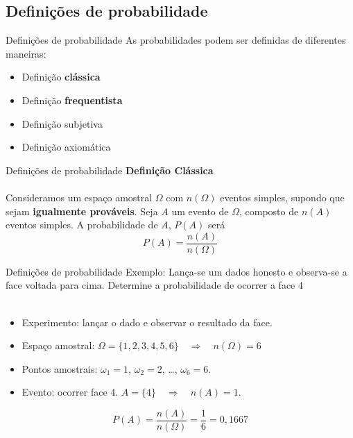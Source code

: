 \documentclass[10pt]{beamer}\usepackage[]{graphicx}\usepackage[]{color}
\theoremstyle{definition}
\begin{document}
\subsection{Definições de probabilidade}

\begin{frame}{Definições de probabilidade}
  As probabilidades podem ser definidas de diferentes maneiras:
  \begin{itemize}
  \item Definição \textbf{clássica}
  \item Definição \textbf{frequentista}
  \item Definição subjetiva
  \item Definição axiomática
  \end{itemize}
\end{frame}

\begin{frame}{Definições de probabilidade}
  \textbf{Definição Clássica}\\~\\
  Consideramos um espaço amostral $\Omega$ com $n(\Omega)$ eventos simples,
  supondo que sejam \textbf{igualmente prováveis}. Seja $A$ um evento de
  $\Omega$, composto de $n(A)$ eventos simples. A probabilidade de $A$,
  $P(A)$ será
  \begin{equation*}
    P(A) = \frac{n(A)}{n(\Omega)}
  \end{equation*}
\end{frame}

\begin{frame}{Definições de probabilidade}
  Exemplo: Lança-se um dados honesto e observa-se a face voltada para
  cima. Determine a probabilidade de ocorrer a face 4\\~\\ \pause
  \begin{itemize}
  \item Experimento: lançar o dado e observar o resultado da
    face.
  \item Espaço amostral: $\Omega=\{1,2,3,4,5,6\} \quad \Rightarrow \quad
    n(\Omega) = 6$
  \item Pontos amostrais: $\omega_1=\text{1}$, $\omega_2=\text{2}$,
    \ldots, $\omega_6=\text{6}$.
  \item Evento: ocorrer face 4. $A = \{4\} \quad \Rightarrow \quad n(A) = 1$.
  \end{itemize}
  \begin{equation*}
    P(A) = \frac{n(A)}{n(\Omega)} = \frac{1}{6} = 0,1667
  \end{equation*}
\end{frame}
\end{document}
